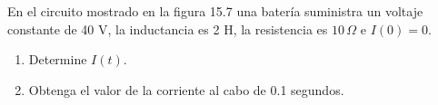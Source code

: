 \item En el circuito mostrado en la figura 15.7 una batería suministra un voltaje constante de 40 V, la inductancia es 2 H, la resistencia es $10 \, \Omega$ e $I(0) = 0$.
    \begin{enumerate}
        \item[(a)] Determine $I(t)$.
        \item[(b)] Obtenga el valor de la corriente al cabo de 0.1 segundos.
    \end{enumerate}
